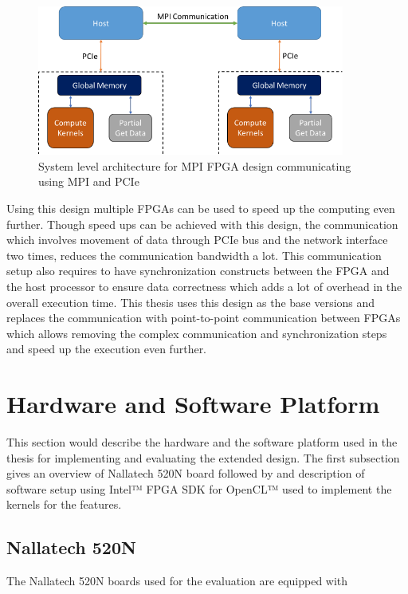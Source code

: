 \begin{figure}[h]%
    \centering
    \includegraphics[width=0.9\textwidth]{images/mpi_fpga}
    \caption{System level architecture for MPI FPGA design communicating using MPI and PCIe}
    \label{fig:mpi_fpga}
\end{figure}

Using this design multiple FPGAs can be used to speed up the computing even further.
Though speed ups can be achieved with this design, the communication which involves
movement of data through \ac{PCIe} bus and the network interface two times,
reduces the communication bandwidth a lot. This communication setup also
requires to have synchronization constructs between the FPGA and the host
processor to ensure data correctness which adds a lot of overhead in the overall
execution time. This thesis uses this design as the base versions and replaces
the communication with point-to-point communication between FPGAs which allows
removing the complex communication and synchronization steps and speed up the
execution even further.

\section{Hardware and Software Platform}

This section would describe the hardware and the software platform used in the
thesis for implementing and evaluating the extended design. The first subsection
gives an overview of Nallatech 520N board followed by and description of software
setup using Intel™ FPGA SDK for OpenCL™ used to implement the kernels for the
features.

\subsection{Nallatech 520N}

The Nallatech 520N boards used for the evaluation are equipped with

